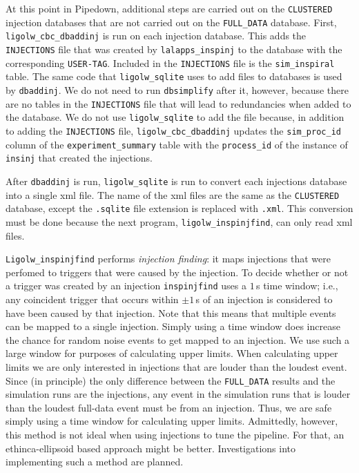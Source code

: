At this point in Pipedown, additional steps are carried out on the \verb|CLUSTERED| injection databases that are not carried out on the \verb|FULL_DATA| database. First, \verb|ligolw_cbc_dbaddinj| is run on each injection database. This adds the \verb|INJECTIONS| file that was created by \verb|lalapps_inspinj| to the database with the corresponding \verb|USER-TAG|. Included in the \verb|INJECTIONS| file is the \verb|sim_inspiral| table. The same code that \verb|ligolw_sqlite| uses to add files to databases is used by \verb|dbaddinj|. We do not need to run \verb|dbsimplify| after it, however, because there are no tables in the \verb|INJECTIONS| file that will lead to redundancies when added to the database. We do not use \verb|ligolw_sqlite| to add the file because, in addition to adding the \verb|INJECTIONS| file, \verb|ligolw_cbc_dbaddinj| updates the \verb|sim_proc_id| column of the \verb|experiment_summary| table with the \verb|process_id| of the instance of \verb|insinj| that created the injections.

After \verb|dbaddinj| is run, \verb|ligolw_sqlite| is run to convert each injections database into a single xml file. The name of the xml files are the same as the \verb|CLUSTERED| database, except the \verb|.sqlite| file extension is replaced with \verb|.xml|. This conversion must be done because the next program, \verb|ligolw_inspinjfind|, can only read xml files.

\verb|Ligolw_inspinjfind| performs \emph{injection finding}: it maps injections that were perfomed to triggers that were caused by the injection. To decide whether or not a trigger was created by an injection \verb|inspinjfind| uses a $1\,$s time window; i.e., any coincident trigger that occurs within $\pm 1\,$s of an injection is considered to have been caused by that injection. Note that this means that multiple events can be mapped to a single injection. Simply using a time window does increase the chance for random noise events to get mapped to an injection. We use such a large window for purposes of calculating upper limits. When calculating upper limits we are only interested in injections that are louder than the loudest event. Since (in principle) the only difference between the \verb|FULL_DATA| results and the simulation runs are the injections, any event in the simulation runs that is louder than the loudest full-data event must be from an injection. Thus, we are safe simply using a time window for calculating upper limits. Admittedly, however, this method is not ideal when using injections to tune the pipeline. For that, an ethinca-ellipsoid based approach might be better. Investigations into implementing such a method are planned.

